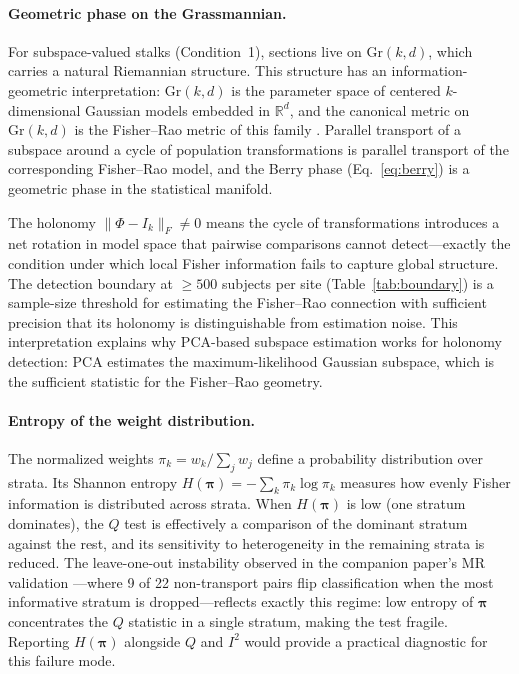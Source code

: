 \documentclass[11pt]{article}
\newcommand{\Gr}{\mathrm{Gr}}
\newcommand{\R}{\mathbb{R}}
\begin{document}
\paragraph{Geometric phase on the Grassmannian.}
For subspace-valued stalks (Condition~1), sections live on $\Gr(k,d)$, which carries a natural Riemannian structure.
This structure has an information-geometric interpretation: $\Gr(k,d)$ is the parameter space of centered $k$-dimensional Gaussian models embedded in $\R^d$, and the canonical metric on $\Gr(k,d)$ is the Fisher--Rao metric of this family \citep{amari2016information}.
Parallel transport of a subspace around a cycle of population transformations is parallel transport of the corresponding Fisher--Rao model, and the Berry phase (Eq.~\ref{eq:berry}) is a geometric phase in the statistical manifold.

The holonomy $\|\Phi - I_k\|_F \neq 0$ means the cycle of transformations introduces a net rotation in model space that pairwise comparisons cannot detect---exactly the condition under which local Fisher information fails to capture global structure.
The detection boundary at $\geq 500$ subjects per site (Table~\ref{tab:boundary}) is a sample-size threshold for estimating the Fisher--Rao connection with sufficient precision that its holonomy is distinguishable from estimation noise.
This interpretation explains why PCA-based subspace estimation works for holonomy detection: PCA estimates the maximum-likelihood Gaussian subspace, which is the sufficient statistic for the Fisher--Rao geometry.

\paragraph{Entropy of the weight distribution.}
The normalized weights $\pi_k = w_k / \sum_j w_j$ define a probability distribution over strata.
Its Shannon entropy $H(\boldsymbol{\pi}) = -\sum_k \pi_k \log \pi_k$ measures how evenly Fisher information is distributed across strata.
When $H(\boldsymbol{\pi})$ is low (one stratum dominates), the $Q$ test is effectively a comparison of the dominant stratum against the rest, and its sensitivity to heterogeneity in the remaining strata is reduced.
The leave-one-out instability observed in the companion paper's MR validation \citep{tower2026sheaf}---where 9 of 22 non-transport pairs flip classification when the most informative stratum is dropped---reflects exactly this regime: low entropy of $\boldsymbol{\pi}$ concentrates the $Q$ statistic in a single stratum, making the test fragile.
Reporting $H(\boldsymbol{\pi})$ alongside $Q$ and $I^2$ would provide a practical diagnostic for this failure mode.
\end{document}
